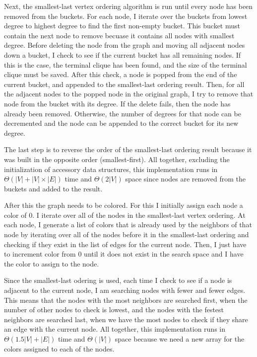 \documentclass{article}
\begin{document}
        Next, the smallest-last vertex ordering algorithm is run until every node has been removed from the buckets. For each node, I iterate over the buckets from lowest degree to highest degree to find the first non-empty bucket. This bucket must contain the next node to remove becuase it contains all nodes with smallest degree. Before deleting the node from the graph and moving all adjacent nodes down a bucket, I check to see if the current bucket has all remaining nodes. If this is the case, the terminal clique has been found, and the size of the terminal clique must be saved. After this check, a node is popped from the end of the current bucket, and appended to the smallest-last ordering result. Then, for all the adjacent nodes to the popped node in the original graph, I try to remove that node from the bucket with its degree. If the delete fails, then the node has already been removed. Otherwise, the number of degrees for that node can be decremented and the node can be appended to the correct bucket for its new degree.
        \par
        The last step is to reverse the order of the smallest-last ordering result because it was built in the opposite order (smallest-first). All together, excluding the initialization of accessory data structures, this implementation runs in $\Theta(|V| + |V|\times |E|)$ time and $\Theta(2|V|)$ space since nodes are removed from the buckets and added to the result.
        \par
        After this the graph needs to be colored. For this I initially assign each node a color of $0$. I iterate over all of the nodes in the smallest-last vertex ordering. At each node, I generate a list of colors that is already used by the neighbors of that node by iterating over all of the nodes before it in the smallest-last ordering and checking if they exist in the list of edges for the current node. Then, I just have to increment color from $0$ until it does not exist in the search space and I have the color to assign to the node.
        \par
        Since the smallest-last odering is used, each time I check to see if a node is adjacent to the current node, I am searching nodes with fewer and fewer edges. This means that the nodes with the most neighbors are searched first, when the number of other nodes to check is lowest, and the nodes with the festest neighbors are searched last, when we have the most nodes to check if they share an edge with the current node. All together, this implementation runs in $\Theta(1.5|V| + |E|)$ time and $\Theta(|V|)$ space because we need a new array for the colors assigned to each of the nodes.
\end{document}
